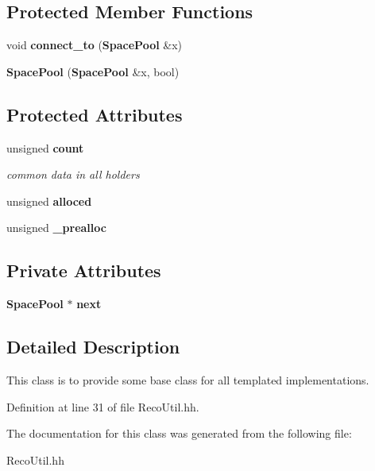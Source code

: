 \subsection*{Protected Member Functions}
\begin{DoxyCompactItemize}
\item 
void {\bfseries connect\_\-to} ({\bf SpacePool} \&x)\label{classSpacePool_a3d1b4392f58b92aed09ac972b1244114}

\item 
{\bfseries SpacePool} ({\bf SpacePool} \&x, bool)\label{classSpacePool_ab80170ef5ee1fbc371ea2ff4ead7a38b}

\end{DoxyCompactItemize}
\subsection*{Protected Attributes}
\begin{DoxyCompactItemize}
\item 
unsigned {\bf count}\label{classSpacePool_ae6b1754e19e2d105a2d3ea870bdca86f}

\begin{DoxyCompactList}\small\item\em common data in all holders \item\end{DoxyCompactList}\item 
unsigned {\bfseries alloced}\label{classSpacePool_a5acf9c577dd6d872d69c24916026f002}

\item 
unsigned {\bfseries \_\-prealloc}\label{classSpacePool_ab88631665439889f3c8981841f6c8ad1}

\end{DoxyCompactItemize}
\subsection*{Private Attributes}
\begin{DoxyCompactItemize}
\item 
{\bf SpacePool} $\ast$ {\bfseries next}\label{classSpacePool_acdbefd16991b86ea2397997074193484}

\end{DoxyCompactItemize}


\subsection{Detailed Description}
This class is to provide some base class for all templated implementations. 

Definition at line 31 of file RecoUtil.hh.

The documentation for this class was generated from the following file:\begin{DoxyCompactItemize}
\item 
RecoUtil.hh\end{DoxyCompactItemize}
